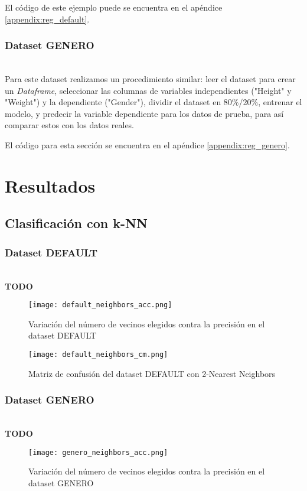 \documentclass[sigconf,authorversion,nonacm]{acmart}
\begin{document}
El código de este ejemplo puede se encuentra en el apéndice \ref{appendix:reg_default}.

\subsubsection{Dataset GENERO}\hfill\\
Para este dataset realizamos un procedimiento similar: leer el dataset para crear un \textit{Dataframe}, seleccionar las columnas de variables independientes ("Height" y "Weight") y la dependiente ("Gender"), dividir el dataset en 80\%/20\%, entrenar el modelo, y predecir la variable dependiente para los datos de prueba, para así comparar estos con los datos reales.

El código para esta sección se encuentra en el apéndice \ref{appendix:reg_genero}.


\section{Resultados}

\subsection{Clasificación con k-NN}

\subsubsection{Dataset DEFAULT}\hfill\\
\textbf{TODO}

\begin{figure}[H]
  \centering
  \texttt{[image: default\_neighbors\_acc.png]}
  \caption{Variación del número de vecinos elegidos contra la precisión en el dataset DEFAULT}
\end{figure}

\begin{figure}[H]
  \centering
  \texttt{[image: default\_neighbors\_cm.png]}
  \caption{Matriz de confusión del dataset DEFAULT con 2-Nearest Neighbors}
\end{figure}

\subsubsection{Dataset GENERO}\hfill\\
\textbf{TODO}

\begin{figure}[H]
  \centering
  \texttt{[image: genero\_neighbors\_acc.png]}
  \caption{Variación del número de vecinos elegidos contra la precisión en el dataset GENERO}
\end{figure}
\end{document}
